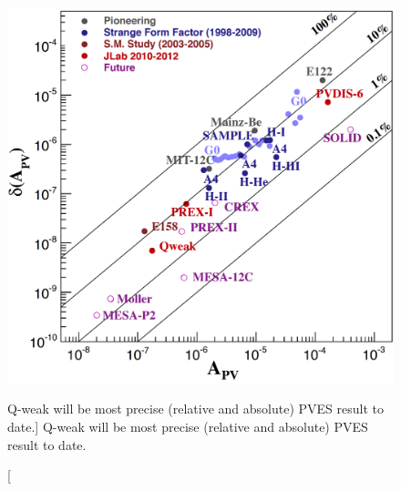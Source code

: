 
%


%

\begin{singlespace}
\begin{figure}[!h]
	\begin{center}
	\includegraphics[width=15.0cm]{figures/PVAsymmetry}
	\end{center}
	\caption
	[Q-weak will be most precise (relative and absolute) PVES result to date.]
	{Q-weak will be most precise (relative and absolute) PVES result to date.}
	\label{fig:PVAsymmetry}
\end{figure}
\end{singlespace}

